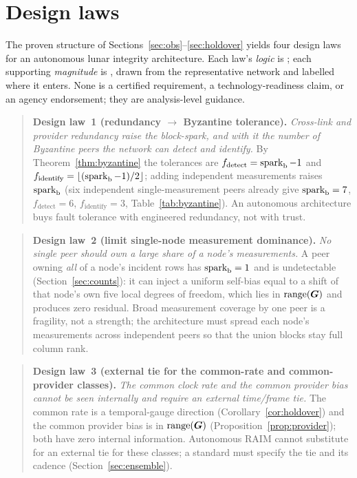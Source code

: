 \section{Design laws}
\label{sec:designlaws}

The proven structure of Sections~\ref{sec:obs}--\ref{sec:holdover} yields four design laws
for an autonomous lunar integrity architecture. Each law's \emph{logic} is \Proven{}; each
supporting \emph{magnitude} is \Modelled{}, drawn from the representative network and labelled
where it enters. None is a certified requirement, a technology-readiness claim, or an agency
endorsement; they are analysis-level guidance.

\begin{quote}
\textbf{Design law~1 (redundancy $\to$ Byzantine tolerance).} \emph{Cross-link and provider
redundancy raise the block-spark, and with it the number of Byzantine peers the network can
detect and identify.} By Theorem~\ref{thm:byzantine} the tolerances are $f_{\mathrm{detect}}=
\operatorname{spark}_{\mathrm b}-1$ and $f_{\mathrm{identify}}=\lfloor(\operatorname{spark}_{\mathrm b}-1)/2\rfloor$;
adding independent measurements raises $\operatorname{spark}_{\mathrm b}$ (six independent single-measurement
peers already give $\operatorname{spark}_{\mathrm b}=7$, $f_{\mathrm{detect}}=6$, $f_{\mathrm{identify}}=3$,
Table~\ref{tab:byzantine}). An autonomous architecture buys fault tolerance with engineered
redundancy, not with trust.
\end{quote}

\begin{quote}
\textbf{Design law~2 (limit single-node measurement dominance).} \emph{No single peer should
own a large share of a node's measurements.} A peer owning \emph{all} of a node's incident
rows has $\operatorname{spark}_{\mathrm b}=1$ and is undetectable (Section~\ref{sec:counts}): it can inject
a uniform self-bias equal to a shift of that node's own five local degrees of freedom, which
lies in $\operatorname{range}(\bm{G})$ and produces zero residual. Broad measurement coverage by one peer is a
fragility, not a strength; the architecture must spread each node's measurements across
independent peers so that the union blocks stay full column rank.
\end{quote}

\begin{quote}
\textbf{Design law~3 (external tie for the common-rate and common-provider classes).}
\emph{The common clock rate and the common provider bias cannot be seen internally and
require an external time/frame tie.} The common rate is a temporal-gauge direction
(Corollary~\ref{cor:holdover}) and the common provider bias is in $\operatorname{range}(\bm{G})$
(Proposition~\ref{prop:provider}); both have zero internal information. Autonomous RAIM cannot
substitute for an external tie for these classes; a standard must specify the tie and its
cadence (Section~\ref{sec:ensemble}).
\end{quote}

